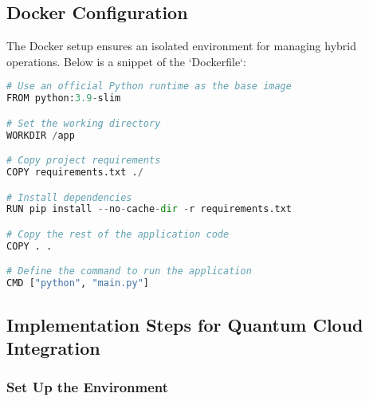 \documentclass[12pt,a4paper]{article}
\begin{document}
\subsection{Docker Configuration}
The Docker setup ensures an isolated environment for managing hybrid operations. Below is a snippet of the `Dockerfile`:

\begin{tcolorbox}[title=Dockerfile Example, colback=gray!5!white, colframe=blue!75!black]
\begin{lstlisting}[language=Python]
# Use an official Python runtime as the base image
FROM python:3.9-slim

# Set the working directory
WORKDIR /app

# Copy project requirements
COPY requirements.txt ./

# Install dependencies
RUN pip install --no-cache-dir -r requirements.txt

# Copy the rest of the application code
COPY . .

# Define the command to run the application
CMD ["python", "main.py"]
\end{lstlisting}
\end{tcolorbox}




\begin{center}
    \fontsize{14}{16}\selectfont \bfseries
    \subsection{Implementation Steps for Quantum Cloud Integration}
\end{center}


\subsubsection{Set Up the Environment}
\end{document}
